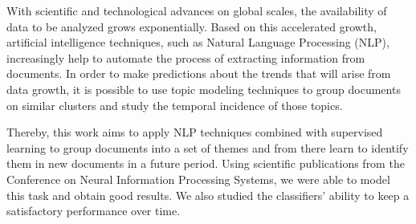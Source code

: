 With scientific and technological advances on global scales, the availability of data to be analyzed grows exponentially. Based on this accelerated growth, artificial intelligence techniques, such as Natural Language Processing (NLP), increasingly help to automate the process of extracting information from documents. In order to make predictions about the trends that will arise from data growth, it is possible to use topic modeling techniques to group documents on similar clusters and study the temporal incidence of those topics.

Thereby, this work aims to apply NLP techniques combined with supervised learning to group documents into a set of themes and from there learn to identify them in new documents in a future period. Using scientific publications from the Conference on Neural Information Processing Systems, we were able to model this task and obtain good results. We also studied the classifiers' ability to keep a satisfactory performance over time.
